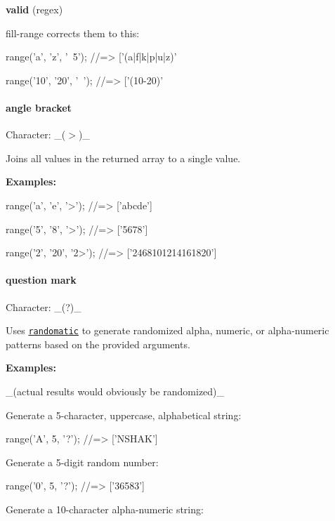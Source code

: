 {\bfseries valid} (regex)

fill-\/range corrects them to this\+:


\begin{DoxyCode}
range('a', 'z', '~5');
//=> ['(a|f|k|p|u|z)'

range('10', '20', '~');
//=> ['(10-20)'
\end{DoxyCode}


\paragraph*{angle bracket}

Character\+: \+\_\+({\ttfamily $>$})\+\_\+

Joins all values in the returned array to a single value.

{\bfseries Examples\+:}


\begin{DoxyCode}
range('a', 'e', '>');
//=> ['abcde']

range('5', '8', '>');
//=> ['5678']

range('2', '20', '2>');
//=> ['2468101214161820']
\end{DoxyCode}


\paragraph*{question mark}

Character\+: \+\_\+({\ttfamily ?})\+\_\+

Uses \href{https://github.com/jonschlinkert/randomatic}{\tt randomatic} to generate randomized alpha, numeric, or alpha-\/numeric patterns based on the provided arguments.

{\bfseries Examples\+:}

\+\_\+(actual results would obviously be randomized)\+\_\+

Generate a 5-\/character, uppercase, alphabetical string\+:


\begin{DoxyCode}
range('A', 5, '?');
//=> ['NSHAK']
\end{DoxyCode}


Generate a 5-\/digit random number\+:


\begin{DoxyCode}
range('0', 5, '?');
//=> ['36583']
\end{DoxyCode}


Generate a 10-\/character alpha-\/numeric string\+:


